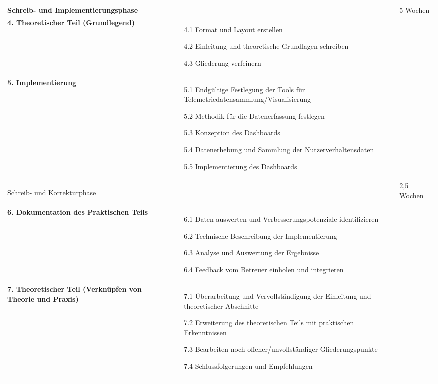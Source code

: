 \documentclass{article}
\begin{document}
\begin{center}
\begin{longtable}{>{\bfseries}p{} p{} p{}}
    Schreib- und Implementierungsphase & & 5 Wochen \\ 
    4. Theoretischer Teil (Grundlegend) & 
    \begin{itemize}
        \item[4.1] Format und Layout erstellen
        \item[4.2] Einleitung und theoretische Grundlagen schreiben
        \item[4.3] Gliederung verfeinern
    \end{itemize} & \\ 
    
    5. Implementierung & 
    \begin{itemize}
        \item[5.1] Endgültige Festlegung der Tools für Telemetriedatensammlung/Visualisierung
        \item[5.2] Methodik für die Datenerfassung festlegen
        \item[5.3] Konzeption des Dashboards
        \item[5.4] Datenerhebung und Sammlung der Nutzerverhaltensdaten
        \item[5.5] Implementierung des Dashboards
    \end{itemize} & \\ \hline
    
    Schreib- und Korrekturphase & & 2,5 Wochen \\ 
    6. Dokumentation des Praktischen Teils & 
    \begin{itemize}
        \item[6.1] Daten auswerten und Verbesserungspotenziale identifizieren
        \item[6.2] Technische Beschreibung der Implementierung
        \item[6.3] Analyse und Auswertung der Ergebnisse
        \item[6.4] Feedback vom Betreuer einholen und integrieren
    \end{itemize} & \\ 
    
    7. Theoretischer Teil (Verknüpfen von Theorie und Praxis) & 
    \begin{itemize}
        \item[7.1] Überarbeitung und Vervollständigung der Einleitung und theoretischer Abschnitte
        \item[7.2] Erweiterung des theoretischen Teils mit praktischen Erkenntnissen
        \item[7.3] Bearbeiten noch offener/unvollständiger Gliederungspunkte
        \item[7.4] Schlussfolgerungen und Empfehlungen
    \end{itemize} & \\ \hline
    

\end{longtable}
\end{center}
\end{document}
